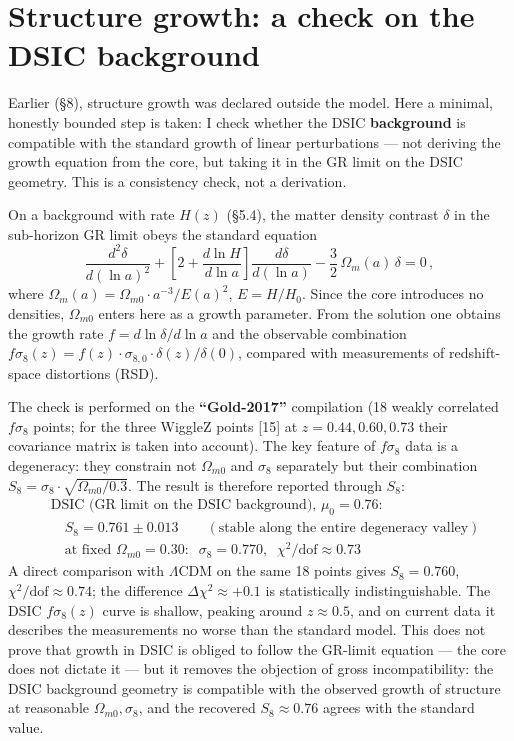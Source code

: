 \documentclass{article}
\begin{document}
\section{Structure growth: a check on the DSIC background}

Earlier (\S8), structure growth was declared outside the model. Here a minimal, honestly bounded step is taken: I check whether the DSIC \textbf{background} is compatible with the standard growth of linear perturbations --- not deriving the growth equation from the core, but taking it in the GR limit on the DSIC geometry. This is a consistency check, not a derivation.

On a background with rate $H(z)$ (\S5.4), the matter density contrast $\delta$ in the sub-horizon GR limit obeys the standard equation
\begin{equation}
\frac{d^2\delta}{d(\ln a)^2} + \left[2 + \frac{d\ln H}{d\ln a}\right]\frac{d\delta}{d(\ln a)} - \frac{3}{2}\,\Omega_m(a)\,\delta = 0\,,
\end{equation}
where $\Omega_m(a) = \Omega_{m0}\cdot a^{-3}/E(a)^2$, $E = H/H_0$. Since the core introduces no densities, $\Omega_{m0}$ enters here as a growth parameter. From the solution one obtains the growth rate $f = d\ln\delta/d\ln a$ and the observable combination $f\sigma_8(z) = f(z)\cdot\sigma_{8,0}\cdot\delta(z)/\delta(0)$, compared with measurements of redshift-space distortions (RSD).

The check is performed on the \textbf{``Gold-2017''} compilation (18 weakly correlated $f\sigma_8$ points; for the three WiggleZ points [15] at $z = 0.44, 0.60, 0.73$ their covariance matrix is taken into account). The key feature of $f\sigma_8$ data is a degeneracy: they constrain not $\Omega_{m0}$ and $\sigma_8$ separately but their combination $S_8 = \sigma_8\cdot\sqrt{\Omega_{m0}/0.3}$. The result is therefore reported through $S_8$:
\begin{align*}
&\text{DSIC (GR limit on the DSIC background), } \mu_0 = 0.76: \\
&\quad S_8 = 0.761 \pm 0.013 \qquad (\text{stable along the entire degeneracy valley}) \\
&\quad \text{at fixed } \Omega_{m0} = 0.30:\;\; \sigma_8 = 0.770,\;\; \chi^2/\text{dof} \approx 0.73
\end{align*}
A direct comparison with $\Lambda$CDM on the same 18 points gives $S_8 = 0.760$, $\chi^2/\text{dof} \approx 0.74$; the difference $\Delta\chi^2 \approx +0.1$ is statistically indistinguishable. The DSIC $f\sigma_8(z)$ curve is shallow, peaking around $z \approx 0.5$, and on current data it describes the measurements no worse than the standard model. This does not prove that growth in DSIC is obliged to follow the GR-limit equation --- the core does not dictate it --- but it removes the objection of gross incompatibility: the DSIC background geometry is compatible with the observed growth of structure at reasonable $\Omega_{m0}, \sigma_8$, and the recovered $S_8 \approx 0.76$ agrees with the standard value.
\end{document}

